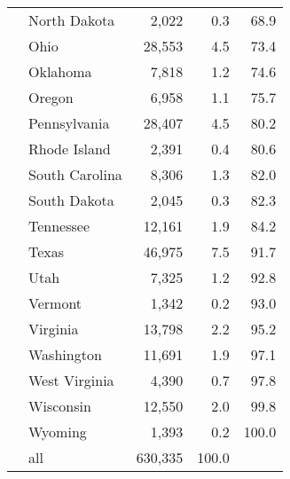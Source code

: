\begin{longtable}{ll|rrr}
    & North Dakota & 2,022 & 0.3 & 68.9 \\ 
    & Ohio & 28,553 & 4.5 & 73.4 \\ 
    & Oklahoma & 7,818 & 1.2 & 74.6 \\ 
    & Oregon & 6,958 & 1.1 & 75.7 \\ 
    & Pennsylvania & 28,407 & 4.5 & 80.2 \\ 
    & Rhode Island & 2,391 & 0.4 & 80.6 \\ 
    & South Carolina & 8,306 & 1.3 & 82.0 \\ 
    & South Dakota & 2,045 & 0.3 & 82.3 \\ 
    & Tennessee & 12,161 & 1.9 & 84.2 \\ 
    & Texas & 46,975 & 7.5 & 91.7 \\ 
    & Utah & 7,325 & 1.2 & 92.8 \\ 
    & Vermont & 1,342 & 0.2 & 93.0 \\ 
    & Virginia & 13,798 & 2.2 & 95.2 \\ 
    & Washington & 11,691 & 1.9 & 97.1 \\ 
    & West Virginia & 4,390 & 0.7 & 97.8 \\ 
    & Wisconsin & 12,550 & 2.0 & 99.8 \\ 
    & Wyoming & 1,393 & 0.2 & 100.0 \\ 
    \hline
    & all & 630,335 & 100.0 &  \\ 
       \hline
    \hline
    \hline
    \end{longtable}
    \endgroup


\newpage
